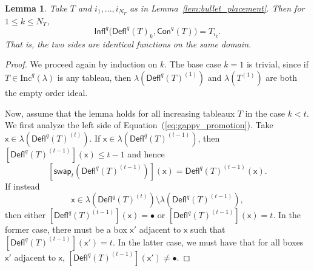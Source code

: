 \documentclass[12pt]{amsart}
\newcommand{\x}{\ensuremath{\mathsf{x}}}
\newtheorem{lemma}[theorem]{Lemma}
\theoremstyle{definition}
\theoremstyle{remark}
\numberwithin{equation}{section}
\renewcommand{\emptyset}{\varnothing}
\newcommand{\inc}{\ensuremath{\mathrm{Inc}}}
\newcommand{\swap}{\ensuremath{\mathsf{swap}}}
\newcommand{\rep}{\ensuremath{\mathsf{Rep}}}
\newcommand{\deflate}{\ensuremath{\mathsf{Defl}}}
\newcommand{\tinflate}{\ensuremath{\mathsf{Infl}}}
\newcommand{\content}{\ensuremath{\mathsf{Con}}}
\begin{document}
\begin{lemma} \label{lem:gappy_promotion}
Take $T$ and $i_1,...,i_{N_T}$ as in Lemma~\ref{lem:bullet_placement}. Then for $1 \leq k \leq N_T$, 
\begin{equation}\label{eq:gappy_promotion}
 \tinflate^q \Big( \deflate^q(T)_k, \content^q(T) \Big) = T_{i_k}. 
\end{equation}
That is, the two sides are identical functions on the same domain. 
\end{lemma}

\begin{proof}  We proceed again by induction on $k$. The base case $k=1$ is trivial, since if $T \in \inc^q(\lambda)$ is any tableau, then $\lambda \left( \deflate^q(T)^{(1)} \right)$ and $\lambda \left( T^{(1)} \right)$ are both the empty order ideal.

Now, assume that the lemma holds for all increasing tableaux $T$ in the case $k < t$. We first analyze the left side of Equation~(\ref{eq:gappy_promotion}). Take $\x \in \lambda\left( \deflate^q(T)^{(t)} \right)$. If $\x \in \lambda\left( \deflate^q(T)^{(t-1)} \right)$, then 
$[\deflate^q(T)^{(t-1)}](\x) \leq t-1$ and hence
\[
\left[ \swap_{t}(\deflate^q(T)^{(t-1)})\right](\x) = \deflate^q(T)^{(t-1)}(\x).
\]
 If instead
 \[\x \in \lambda\left(\deflate^q(T)^{(t)}\right) \setminus \lambda\left(\deflate^q(T)^{(t-1)}\right),\]
  then either $[\deflate^q(T)^{(t-1)}](\x) = \bullet$ or $[\deflate^q(T)^{(t-1)}](\x) = t$. In the former case, there must be a box $\x'$ adjacent to $\x$ such that $[\deflate^q(T)^{(t-1)}](\x') = t$. In the latter case, we must have that for all boxes $\x'$ adjacent to $\x$, $[\deflate^q(T)^{(t-1)}](\x') \neq \bullet$. 


\end{proof}
\end{document}
